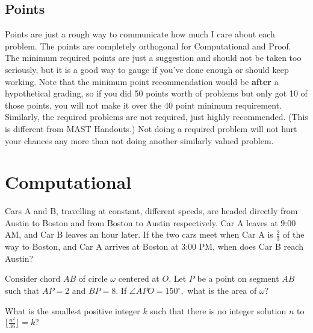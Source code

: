 \documentclass{lucky}
\begin{document}
\subsection{Points}
Points are just a rough way to communicate how much I care about each problem. The points are completely orthogonal for Computational and Proof. The minimum required points are just a suggestion and should not be taken too seriously, but it is a good way to gauge if you've done enough or should keep working. Note that the minimum point recommendation would be \textbf{after} a hypothetical grading, so if you did 50 points worth of problems but only got 10 of those points, you will not make it over the 40 point minimum requirement.
\\[1\baselineskip]
Similarly, the required problems are not required, just highly recommended. (This is different from MAST Handouts.) Not doing a required problem will not hurt your chances any more than not doing another similarly valued problem.

\pagebreak

\section{Computational}


\vspace{0.3cm}

\begin{prob}{1}
    Cars A and B, travelling at constant, different speeds, are headed directly from Austin to Boston and from Boston to Austin respectively. Car A leaves at $9\text{:}00$ AM, and Car B leaves an hour later. If the two cars meet when Car A is $\frac{2}{3}$ of the way to Boston, and Car A arrives at Boston at $3\text{:}00$ PM, when does Car B reach Austin?
\end{prob}

\begin{prob}{2}
    Consider chord $AB$ of circle $\omega$ centered at $O.$ Let $P$ be a point on segment $AB$ such that $AP=2$ and $BP=8.$ If $\angle APO=150^{\circ},$ what is the area of $\omega?$
\end{prob}

\begin{prob}{3}
    What is the smallest positive integer $k$ such that there is no integer solution $n$ to $\lfloor \frac{n^2}{36}\rfloor=k?$
\end{prob}
\end{document}
